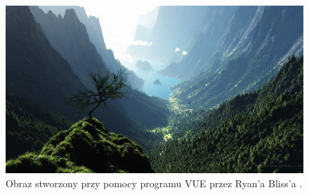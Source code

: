 \documentclass[inz,longabstract]{iithesis}
\begin{document}
        \begin{figure}[H] 
            \includegraphics[width=\linewidth]{vue.png}
            \caption{Obraz stworzony przy pomocy programu VUE przez Ryan'a Bliss'a \cite{vue}.} 
            \label{fig:vue}
        \end{figure}




\end{document}
